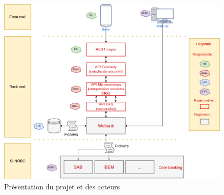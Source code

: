 \begin{figure}[H]
\raggedleft
	\includegraphics[scale=0.45]{images/travailNeuflizeOBC/architecture/archiFonc.png}
	\centering
	\caption{Présentation du projet et des acteurs}
	\label{archiFonc}
\end{figure}